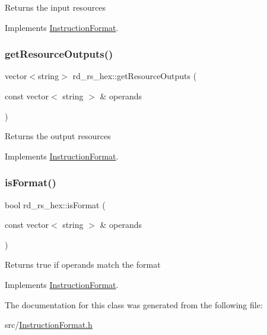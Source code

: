 Returns the input resources 

Implements \hyperlink{classInstructionFormat_a09775d3a3c22f40a0f44504664e586e4}{Instruction\+Format}.

\mbox{\label{classrd__rs__hex_a268da92bc87148bd3f8f5b0086a442f5}} 
\subsubsection{\texorpdfstring{get\+Resource\+Outputs()}{getResourceOutputs()}}
{\footnotesize\ttfamily vector$<$string$>$ rd\+\_\+rs\+\_\+hex\+::get\+Resource\+Outputs (\begin{DoxyParamCaption}\item[{const vector$<$ string $>$ \&}]{operands }\end{DoxyParamCaption})\hspace{0.3cm}{\ttfamily [virtual]}}

Returns the output resources 

Implements \hyperlink{classInstructionFormat_a95cd28ffb1bde59b67f676880ab10536}{Instruction\+Format}.

\mbox{\label{classrd__rs__hex_ae39510e90b575861fdaa315308ef8638}} 
\subsubsection{\texorpdfstring{is\+Format()}{isFormat()}}
{\footnotesize\ttfamily bool rd\+\_\+rs\+\_\+hex\+::is\+Format (\begin{DoxyParamCaption}\item[{const vector$<$ string $>$ \&}]{operands }\end{DoxyParamCaption})\hspace{0.3cm}{\ttfamily [virtual]}}

Returns true if operands match the format 

Implements \hyperlink{classInstructionFormat_a9fdcf94dcd7d9a55ba86e7a63f04d1fe}{Instruction\+Format}.



The documentation for this class was generated from the following file\+:\begin{DoxyCompactItemize}
\item 
src/\hyperlink{InstructionFormat_8h}{Instruction\+Format.\+h}\end{DoxyCompactItemize}
